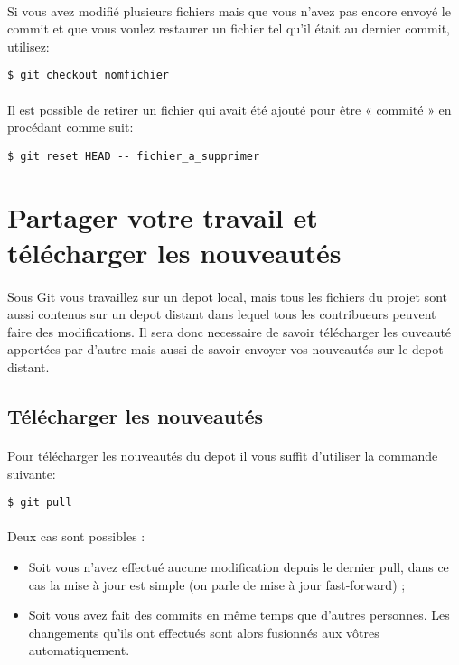 \documentclass[french, a4paper, 12pt, titlepage]{article}
\begin{document}
\paragraph{}Si vous avez modifié plusieurs fichiers mais que vous n’avez pas encore envoyé le commit et que vous voulez restaurer un fichier tel qu’il était au dernier commit, utilisez:
\begin{lstlisting}
$ git checkout nomfichier
\end{lstlisting}
\paragraph{}Il est possible de retirer un fichier qui avait été ajouté pour être « commité » en procédant comme suit:
\begin{lstlisting}
$ git reset HEAD -- fichier_a_supprimer
\end{lstlisting}

\section{Partager votre travail et télécharger les nouveautés}
\paragraph{}Sous Git vous travaillez sur un depot local, mais tous les fichiers du projet sont aussi contenus sur un depot distant dans lequel tous les contribueurs peuvent faire des modifications. Il sera donc necessaire de savoir télécharger les ouveauté apportées par d'autre mais aussi de savoir envoyer vos nouveautés sur le depot distant.
\subsection{Télécharger les nouveautés}
\paragraph{}Pour télécharger les nouveautés du depot il vous suffit d'utiliser la commande suivante:
\begin{lstlisting}
$ git pull
\end{lstlisting}
\paragraph{}Deux cas sont possibles :
\begin{itemize}
\item Soit vous n’avez effectué aucune modification depuis le dernier pull, dans ce cas la mise à jour est simple (on parle de mise à jour fast-forward) ;
\item Soit vous avez fait des commits en même temps que d’autres personnes. Les changements qu’ils ont effectués sont alors fusionnés aux vôtres automatiquement.
\end{itemize}
\end{document}
